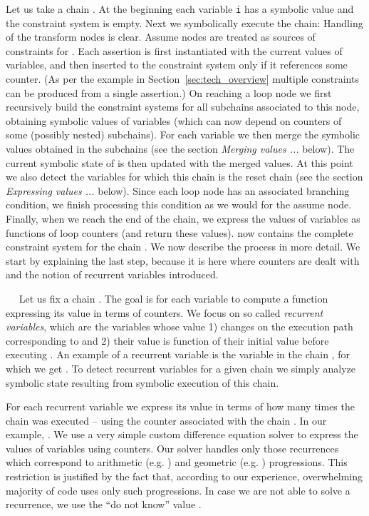\documentclass{llncs}
\renewcommand{\paragraph}[1]{\vspace{0.2cm}\noindent{\bf #1}~~}
\begin{document}
Let us take a chain . At the beginning
each variable \texttt{i} has a symbolic value  and the
constraint system  is empty. Next we 
symbolically execute the chain: Handling of the transform nodes is
clear. Assume nodes are treated as sources of constraints for .  Each assertion
is first instantiated with the current  values of variables, and
then inserted to the constraint system only if it references some
counter. (As per the example in Section~\ref{sec:tech_overview} multiple
constraints can be produced from a single assertion.)  On reaching a loop
node  we first recursively build the constraint systems for all subchains associated
to this node, obtaining symbolic values of variables (which can now depend
on counters of some (possibly nested) subchains). For each
variable we then merge the symbolic values obtained in the
subchains (see the section \emph{Merging values ...} below). The current
symbolic state of  is then updated with the merged values.
At this point we also detect the variables for which this chain is the reset
chain (see the section \emph{Expressing values ...} below).
Since each loop node has an associated branching condition, we finish
processing this condition as we would for the assume node. Finally, when we
reach the end of the chain, we express the values of variables as
functions of loop counters (and return these values).  now contains the complete constraint
system for the chain .
We now describe the process in more detail. We start by explaining the last
step, because it is here where counters are dealt with and the notion of
recurrent variables introduced.

\paragraph{Expressing values using counters}
Let us fix a chain . The goal is for each variable to compute a function expressing
its value in terms of counters. 
We focus on so called \emph{recurrent variables}, which are the variables
whose value 1) changes on the execution path corresponding to  and 2)
their value is function of their initial value before executing . An
example of a recurrent variable is the variable  in the chain
, for which we get . To detect
recurrent variables for a given chain  we simply analyze symbolic state
resulting from symbolic execution of this chain.

For each recurrent variable we express its value in terms of how many
times the chain  was executed -- using the counter  associated
with the chain . In our example,
.  We use a very simple custom difference
equation solver to express the values of variables using counters. 
Our solver handles only those recurrences which
correspond to arithmetic (e.g. ) and geometric
(e.g. ) progressions. This restriction is
justified by the fact that, according to our experience, overwhelming
majority of code uses only such progressions. In case we are not able to
solve a recurrence, we use the ``do not know'' value . 
 
\end{document}
